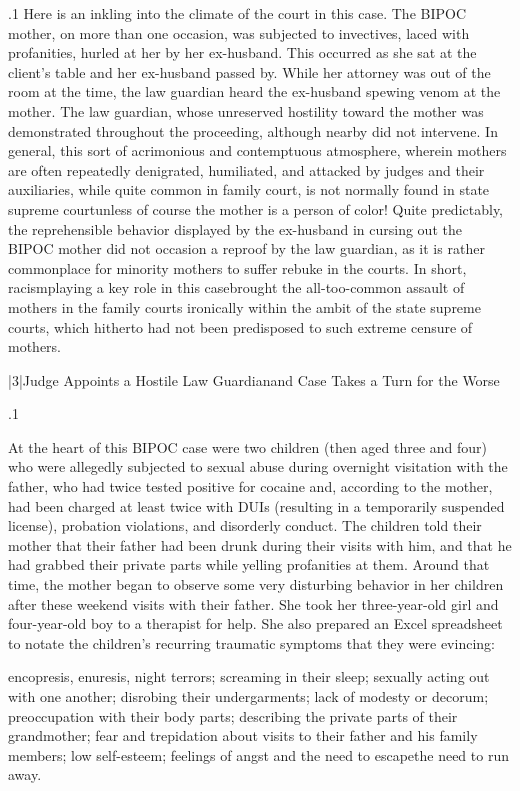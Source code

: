 \documentclass[11pt, twoside]{article}
\begin{document}
{\p.1{%
Here is an inkling into the climate of the court in this case. The BIPOC
mother, on more than one occasion, was subjected to invectives, laced
with profanities, hurled at her by her ex-husband. This occurred as she
sat at the client’s table and her ex-husband passed by. While her attorney was out of the room at the time, the law guardian heard the
ex-husband spewing venom at the mother. The law guardian, whose
unreserved hostility toward the mother was demonstrated throughout
the proceeding, although nearby did not intervene. In general, this
sort of acrimonious and contemptuous atmosphere, wherein mothers
are often repeatedly denigrated, humiliated, and attacked by judges and
their auxiliaries, while quite common in family court, is not normally
found in state supreme court\mdash{}unless of course the mother is a person
of color! Quite predictably, the reprehensible behavior displayed by the
ex-husband in cursing out the BIPOC mother did not occasion a reproof
by the law guardian, as it is rather commonplace for minority mothers to suffer rebuke in the courts. In short, racism\mdash{}playing a
key role in this case\mdash{}brought the all-too-common assault of mothers in
the family courts ironically within the ambit of the state supreme courts,
which hitherto had not been predisposed to such extreme censure of
mothers.
}%


\s|3|{Judge Appoints a Hostile Law Guardian\mdash{}and Case Takes a Turn for the Worse}

\p.1{%
\noindent{}At the heart of this BIPOC case were two children (then aged three and
four) who were allegedly subjected to sexual abuse during overnight visitation with the father, who had twice tested positive for cocaine and,
according to the mother, had been charged at least twice with DUIs (resulting in a temporarily suspended license), probation violations, and
disorderly conduct. The children told their mother that their father had
been drunk during their visits with him, and that he had grabbed their
private parts while yelling profanities at them. Around that time, the
mother began to observe some very disturbing behavior in her children
after these weekend visits with their father. She took her three-year-old
girl and four-year-old boy to a therapist for help. She also prepared an
Excel spreadsheet to notate the children’s recurring traumatic symptoms
that they were evincing:

\begin{blockQuote}
encopresis, enuresis, night terrors; screaming in their sleep; sexually acting out with one another; disrobing their undergarments;
lack of modesty or decorum; preoccupation with their body parts;
describing the private parts of their grandmother; fear and trepidation about visits to their father and his family members; low
self-esteem; feelings of angst and the need to escape\mdash{}the need to
run away.
\end{blockQuote}

}}
\end{document}
